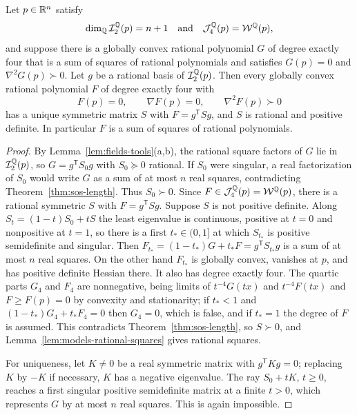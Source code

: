 \begin{theorem}
\label{thm:fields-descent}
Let $p\in\mathbb R^n$ satisfy
\[
 \dim_\mathbb Q\mathcal I_2^\mathbb Q(p)=n+1
 \quad\text{and}\quad
 \mathcal J_4^\mathbb Q(p)=\mathcal W^\mathbb Q(p),
\]
and suppose there is a globally convex rational polynomial $G$ of degree
exactly four that is a sum of squares of rational polynomials and satisfies
$G(p)=0$ and $\nabla^2G(p)\succ0$. Let $g$ be a rational basis of
$\mathcal I_2^\mathbb Q(p)$. Then every globally convex rational polynomial $F$ of
degree exactly four with
\[
 F(p)=0,\qquad \nabla F(p)=0,\qquad \nabla^2F(p)\succ0
\]
has a unique symmetric matrix $S$ with $F=g^{\mathsf T}Sg$, and $S$ is
rational and positive definite. In particular $F$ is a sum of squares of
rational polynomials.
\end{theorem}

\begin{proof}
By Lemma~\ref{lem:fields-tools}(a,b), the rational square factors of $G$ lie
in $\mathcal I_2^\mathbb Q(p)$, so $G=g^{\mathsf T}S_0g$ with $S_0\succeq0$ rational.
If $S_0$ were singular, a real factorization of $S_0$ would write $G$ as a sum
of at most $n$ real squares, contradicting Theorem~\ref{thm:sos-length}. Thus
$S_0\succ0$. Since $F\in\mathcal J_4^\mathbb Q(p)=\mathcal W^\mathbb Q(p)$, there is a
rational symmetric $S$ with $F=g^{\mathsf T}Sg$. Suppose $S$ is not positive
definite. Along $S_t=(1-t)S_0+tS$ the least eigenvalue is continuous,
positive at $t=0$ and nonpositive at $t=1$, so there is a first
$t_*\in(0,1]$ at which $S_{t_*}$ is positive semidefinite and singular. Then
$F_{t_*}=(1-t_*)G+t_*F=g^{\mathsf T}S_{t_*}g$ is a sum of at most $n$ real
squares. On the other hand $F_{t_*}$ is globally convex, vanishes at $p$, and
has positive definite Hessian there. It also has degree exactly four. The
quartic parts $G_4$ and $F_4$ are nonnegative, being limits of
$t^{-4}G(tx)$ and $t^{-4}F(tx)$ and $F\ge F(p)=0$ by convexity and
stationarity; if $t_*<1$ and $(1-t_*)G_4+t_*F_4=0$ then $G_4=0$, which is
false, and if $t_*=1$ the degree of $F$ is assumed. This contradicts
Theorem~\ref{thm:sos-length}, so $S\succ0$, and
Lemma~\ref{lem:models-rational-squares} gives rational squares.

For uniqueness, let $K\ne0$ be a real symmetric matrix with
$g^{\mathsf T}Kg=0$; replacing $K$ by $-K$ if necessary, $K$ has a negative
eigenvalue. The ray $S_0+tK$, $t\ge0$, reaches a first singular positive
semidefinite matrix at a finite $t>0$, which represents $G$ by at most $n$
real squares. This is again impossible.
\end{proof}

